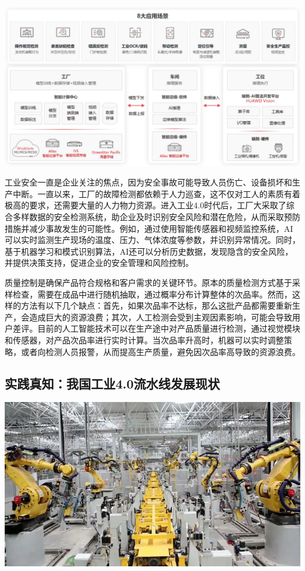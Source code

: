 \begin{marginfigure}
    \includegraphics{images/industry_6.png}
\end{marginfigure}

工业安全一直是企业关注的焦点，因为安全事故可能导致人员伤亡、设备损坏和生产中断。一直以来，工厂的故障检测都依赖于人力巡查，这不仅对工人的素质有着极高的要求，还需要大量的人力物力资源。进入工业4.0时代后，工厂大采取了综合多样数据的安全检测系统，助企业及时识别安全风险和潜在危险，从而采取预防措施并减少事故发生的可能性。例如，通过使用智能传感器和视频监控系统，AI可以实时监测生产现场的温度、压力、气体浓度等参数，并识别异常情况。同时，基于机器学习和模式识别算法，AI还可以分析历史数据，发现隐含的安全风险，并提供决策支持，促进企业的安全管理和风险控制。

质量控制是确保产品符合规格和客户需求的关键环节。原本的质量检测方式基于采样检查，需要在成品中进行随机抽取，通过概率分布计算整体的次品率。然而，这样的方法有以下几个缺点：首先，如果次品率不达标，那么这批产品都需要重新生产，会造成巨大的资源浪费；其次，人工检测会受到主观因素影响，可能会导致用户差评。目前的人工智能技术可以在生产途中对产品质量进行检测，通过视觉模块和传感器，对产品次品率进行实时计算。当次品率升高时，机器可以实时调整策略，或者向检测人员报警，从而提高生产质量，避免因次品率高导致的资源浪费。 

\subsection{实践真知：我国工业4.0流水线发展现状}

\begin{marginfigure}
    \includegraphics{images/industry_7.png}
\end{marginfigure}

